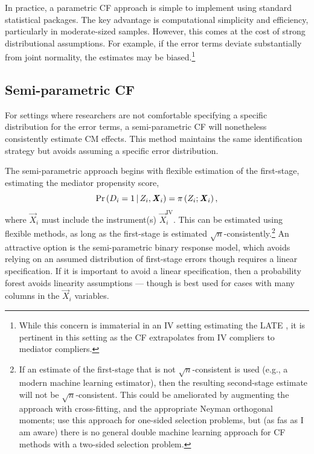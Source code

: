 In practice, a parametric CF approach is simple to implement using standard statistical packages.
The key advantage is computational simplicity and efficiency, particularly in moderate-sized samples.
However, this comes at the cost of strong distributional assumptions.
For example, if the error terms deviate substantially from joint normality, the estimates may be biased.\footnote{
    While this concern is immaterial in an IV setting estimating the LATE \citep{kline2019heckits}, it is pertinent in this setting as the CF extrapolates from IV compliers to mediator compliers.
}

\subsection{Semi-parametric CF}
For settings where researchers are not comfortable specifying a specific distribution for the error terms, a semi-parametric CF will nonetheless consistently estimate CM effects.
This method maintains the same identification strategy but avoids assuming a specific error distribution.

The semi-parametric approach begins with flexible estimation of the first-stage, estimating the mediator propensity score,
\[ \Pr\left( D_i = 1 \, \middle\vert \, Z_i, \boldsymbol{\mathit{X}}_i \right)
    = \pi\left(Z_i; \boldsymbol{\mathit{X}}_i \right), \]
where $\vec X_i$ must include the instrument(s) $\vec X_i^{\text{IV}}$.
This can be estimated using flexible methods, as long as the first-stage is estimated $\sqrt{n}$-consistently.\footnote{
    If an estimate of the first-stage that is not $\sqrt{n}$-consistent is used (e.g., a modern machine learning estimator), then the resulting second-stage estimate will not be $\sqrt{n}$-consistent.
    This could be ameliorated by augmenting the approach with cross-fitting, and the appropriate Neyman orthogonal moments; \cite{bia2024double} use this approach for one-sided selection problems, but (as fas as I am aware) there is no general double machine learning approach for CF methods with a two-sided selection problem.
}
An attractive option is the \cite{klein1993efficient} semi-parametric binary response model, which avoids relying on an assumed distribution of first-stage errors though requires a linear specification.
If it is important to avoid a linear specification, then a probability forest avoids linearity assumptions \citep{athey2019generalized} --- though is best used for cases with many columns in the $\vec X_i$ variables.

